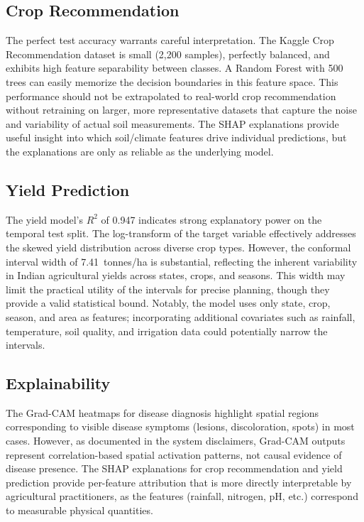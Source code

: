 \documentclass[conference]{IEEEtran}
\begin{document}
\subsection{Crop Recommendation}
The perfect test accuracy warrants careful interpretation. The Kaggle Crop Recommendation dataset is small (2,200 samples), perfectly balanced, and exhibits high feature separability between classes. A Random Forest with 500 trees can easily memorize the decision boundaries in this feature space. This performance should not be extrapolated to real-world crop recommendation without retraining on larger, more representative datasets that capture the noise and variability of actual soil measurements. The SHAP explanations provide useful insight into which soil/climate features drive individual predictions, but the explanations are only as reliable as the underlying model.

\subsection{Yield Prediction}
The yield model's $R^{2}$ of 0.947 indicates strong explanatory power on the temporal test split. The log-transform of the target variable effectively addresses the skewed yield distribution across diverse crop types. However, the conformal interval width of 7.41~tonnes/ha is substantial, reflecting the inherent variability in Indian agricultural yields across states, crops, and seasons. This width may limit the practical utility of the intervals for precise planning, though they provide a valid statistical bound. Notably, the model uses only state, crop, season, and area as features; incorporating additional covariates such as rainfall, temperature, soil quality, and irrigation data could potentially narrow the intervals.

\subsection{Explainability}
The Grad-CAM heatmaps for disease diagnosis highlight spatial regions corresponding to visible disease symptoms (lesions, discoloration, spots) in most cases. However, as documented in the system disclaimers, Grad-CAM outputs represent correlation-based spatial activation patterns, not causal evidence of disease presence. The SHAP explanations for crop recommendation and yield prediction provide per-feature attribution that is more directly interpretable by agricultural practitioners, as the features (rainfall, nitrogen, pH, etc.) correspond to measurable physical quantities.
\end{document}

